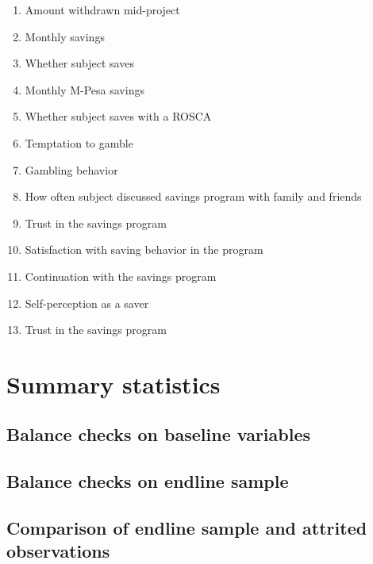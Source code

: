 \documentclass[11pt]{article}
\begin{document}
		\begin{enumerate}
		\item Amount withdrawn mid-project
		\item Monthly savings
		\item Whether subject saves
		\item Monthly M-Pesa savings
		\item Whether subject saves with a ROSCA
		\item Temptation to gamble
		\item Gambling behavior
		\item How often subject discussed savings program with family and friends
		\item Trust in the savings program
		\item Satisfaction with saving behavior in the program
		\item Continuation with the savings program
		\item Self-perception as a saver
		\item Trust in the savings program
		\end{enumerate}
            
\section{Summary statistics}

	\subsection{Balance checks on baseline variables}

        
		
		
		
		
		

	\clearpage

    \subsection{Balance checks on endline sample}

    	
    	
    	
    	
        

	\clearpage

    \subsection{Comparison of endline sample and attrited observations}
\end{document}
